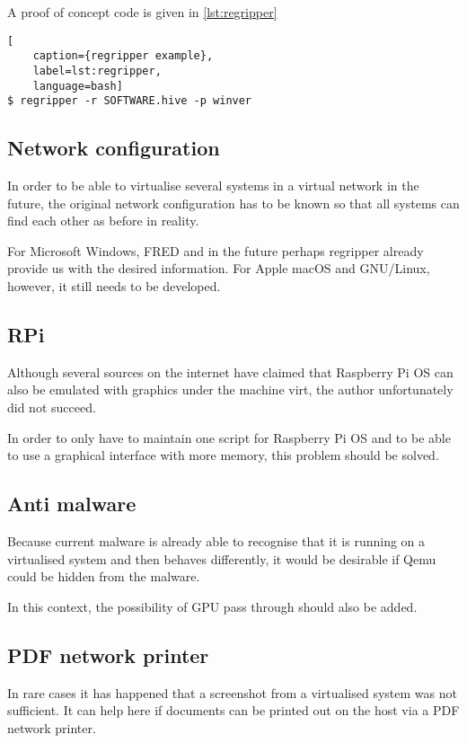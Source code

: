 A proof of concept code is given in \cref{lst:regripper}

\begin{lstlisting}[
    caption={regripper example},
    label=lst:regripper,
    language=bash]
$ regripper -r SOFTWARE.hive -p winver
\end{lstlisting}

\subsection{Network configuration}

In order to be able to virtualise several systems in a virtual network in the future, the original network configuration has to be known so that all systems can find each other as before in reality.

For Microsoft Windows, FRED and in the future perhaps regripper already provide us with the desired information. For Apple macOS and GNU/Linux, however, it still needs to be developed.

\subsection{RPi}

Although several sources on the internet have claimed that Raspberry Pi OS can also be emulated with graphics under the machine virt, the author unfortunately did not succeed.

In order to only have to maintain one script for Raspberry Pi OS and to be able to use a graphical interface with more memory, this problem should be solved.

\subsection{Anti malware}

Because current malware is already able to recognise that it is running on a virtualised system and then behaves differently, it would be desirable if Qemu could be hidden from the malware.

In this context, the possibility of GPU pass through should also be added.

\subsection{PDF network printer}

In rare cases it has happened that a screenshot from a virtualised system was not sufficient. It can help here if documents can be printed out on the host via a PDF network printer.

